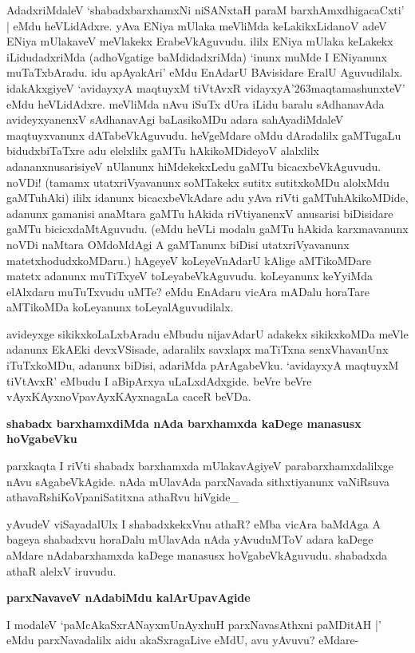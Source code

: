 \noindent
AdadxriMdaleV `shabadxbarxhamxNi niSANxtaH\label{page160a} paraM barxhAmxdhigacaCxti' | eMdu heVLidAdxre. yAva ENiya mUlaka meVliMda keLakikxLidanoV adeV ENiya mUlakaveV meVlakekx ErabeVkAguvudu. ililx ENiya mUlaka keLakekx iLidudadxriMda (adhoVgatige baMdidadxriMda) `inunx muMde I ENiyanunx muTaTxbAradu. idu apAyakAri' eMdu EnAdarU BAvisidare EralU Aguvudilalx. idakAkxgiyeV `avidayxyA maqtuyxM tiVtAvxR\label{160c} vidayxyA\char'263maqtamashunxteV' eMdu heVLidAdxre. meVliMda nAvu iSuTx dUra iLidu baralu sAdhanavAda avideyxyanenxV sAdhanavAgi baLasikoMDu adara sahAyadiMdaleV maqtuyxvanunx dATabeVkAguvudu. heVgeMdare oMdu dAradalilx gaMTugaLu bidudxbiTaTxre adu elelxlilx gaMTu hAkikoMDideyoV alalxlilx adananxnusarisiyeV nUlanunx hiMdekekxLedu gaMTu bicacxbeVkAguvudu. noVDi! (tamamx utatxriVyavanunx soMTakekx sutitx sutitxkoMDu alolxMdu gaMTuhAki) ililx idanunx bicacxbeVkAdare adu yAva riVti gaMTuhAkikoMDide, adanunx gamanisi anaMtara gaMTu hAkida riVtiyanenxV anusarisi biDisidare gaMTu bicicxdaMtAguvudu. (eMdu heVLi modalu gaMTu hAkida karxmavanunx noVDi naMtara OMdoMdAgi A gaMTanunx biDisi utatxriVyavanunx matetxhodudxkoMDaru.) hAgeyeV koLeyeVnAdarU kAlige aMTikoMDare matetx adanunx muTiTxyeV toLeyabeVkAguvudu. koLeyanunx keYyiMda elAlxdaru muTuTxvudu uMTe? eMdu EnAdaru vicAra mADalu horaTare aMTikoMDa koLeyanunx toLeyalAguvudilalx.

avideyxge sikikxkoLaLxbAradu eMbudu nijavAdarU adakekx sikikxkoMDa meVle adanunx EkAEki devxVSisade, adaralilx savxlapx maTiTxna senxVhavanUnx iTuTxkoMDu, adanunx biDisi, adariMda pArAgabeVku. `avidayxyA maqtuyxM tiVtAvxR'\label{161a} eMbudu I aBipArxya uLaLxdAdxgide. beVre beVre vAyxKAyxnoVpavAyxKAyxnagaLa caceR beVDa.

{\bigskip
\noindent
{\large\bf shabadx barxhamxdiMda nAda barxhamxda kaDege manasusx hoVgabeVku}}\label{page161}
\medskip

\noindent
parxkaqta I riVti shabadx barxhamxda mUlakavAgiyeV parabarxhamxdalilxge nAvu sAgabeVkAgide. nAda mUlavAda parxNavada sithxtiyanunx vaNiRsuva athavaRshiKoVpaniSatitxna athaRvu hiVgide\_

yAvudeV viSayadalUlx I shabadxkekxVnu athaR? eMba vicAra baMdAga A bageya shabadxvu horaDalu mUlavAda nAda yAvuduMToV adara kaDege aMdare nAdabarxhamxda kaDege manasusx hoVgabeVkAguvudu. shabadxda athaR alelxV iruvudu.

{\bigskip
\noindent
{\large\bf parxNavaveV nAdabiMdu kalArUpavAgide}}\label{page161a}
\medskip

\noindent
I modaleV `paMcAkaSxrANayxmUnAyxhuH parxNavasAthxni paMDitAH |' eMdu parxNavadalilx aidu akaSxragaLive eMdU, avu yAvuvu? eMdare- 

